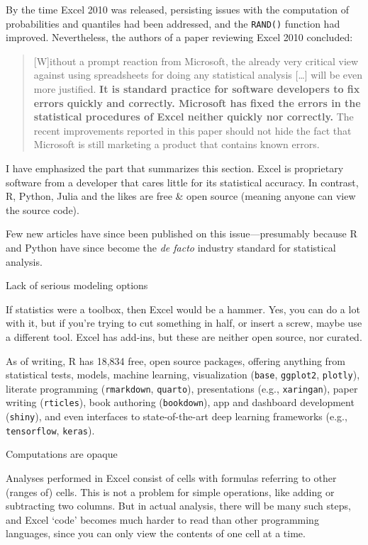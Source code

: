 \documentclass[
]{book}
\begin{document}
By the time Excel 2010 was released, persisting issues with the computation of probabilities and quantiles had been addressed, and the \texttt{RAND()} function had improved.\citep{Excel2010} Nevertheless, the authors of a paper reviewing Excel 2010 concluded:

\begin{quote}
{[}W{]}ithout a prompt reaction from Microsoft, the already very critical view against using spreadsheets for doing any statistical analysis {[}\ldots{]} will be even more justified. \textbf{It is standard practice for software developers to fix errors quickly and correctly. Microsoft has fixed the errors in the statistical procedures of Excel neither quickly nor correctly.} The recent improvements reported in this paper should not hide the fact that Microsoft is still marketing a product that contains known errors.
\end{quote}

I have emphasized the part that summarizes this section. Excel is proprietary software from a developer that cares little for its statistical accuracy. In contrast, R, Python, Julia and the likes are free \& open source (meaning anyone can view the source code).

Few new articles have since been published on this issue---presumably because R and Python have since become the \emph{de facto} industry standard for statistical analysis.

Lack of serious modeling options

If statistics were a toolbox, then Excel would be a hammer. Yes, you can do a lot with it, but if you're trying to cut something in half, or insert a screw, maybe use a different tool. Excel has add-ins, but these are neither open source, nor curated.

As of writing, R has 18,834 free, open source packages, offering anything from statistical tests, models, machine learning, visualization (\texttt{base}, \texttt{ggplot2}, \texttt{plotly}), literate programming (\texttt{rmarkdown}, \texttt{quarto}), presentations (e.g., \texttt{xaringan}), paper writing (\texttt{rticles}), book authoring (\texttt{bookdown}), app and dashboard development (\texttt{shiny}), and even interfaces to state-of-the-art deep learning frameworks (e.g., \texttt{tensorflow}, \texttt{keras}).

Computations are opaque

Analyses performed in Excel consist of cells with formulas referring to other (ranges of) cells. This is not a problem for simple operations, like adding or subtracting two columns. But in actual analysis, there will be many such steps, and Excel `code' becomes much harder to read than other programming languages, since you can only view the contents of one cell at a time.
\end{document}
